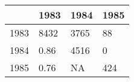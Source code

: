 \begin{table}[ht]
\centering
\begin{tabular}{rlll}
  \hline
 & 1983 & 1984 & 1985 \\ 
  \hline
1983 & 8432 & 3765 & 88 \\ 
  1984 &  0.86 & 4516 & 0 \\ 
  1985 &  0.76 &    NA & 424 \\ 
   \hline
\end{tabular}
\end{table}
